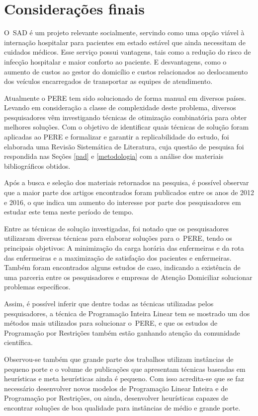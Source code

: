 \section{\esp Considerações finais }\label{conclusão}

O~\ac{SAD} é um projeto relevante socialmente, servindo como uma opção viável à internação hospitalar para pacientes em estado estável que ainda necessitam de cuidados médicos. Esse serviço possui vantagens, tais como a redução do risco de infecção hospitalar e maior conforto ao paciente. E desvantagens, como o aumento de custos ao gestor do domicílio e custos relacionados ao deslocamento dos veículos encarregados de transportar as equipes de atendimento.

Atualmente o \ac{PERE} tem sido solucionado de forma manual em diversos países. Levando em consideração a classe de complexidade deste problema, diversos pesquisadores vêm investigando técnicas de otimização combinatória para obter melhores soluções. Com o objetivo de identificar quais técnicas de solução foram aplicadas ao \ac{PERE} e formalizar e garantir a replicabilidade do estudo, foi elaborada uma Revisão Sistemática de Literatura, cuja questão de pesquisa foi respondida nas Seções \ref{pad} e \ref{metodologia} com a análise dos materiais bibliográficos obtidos.

Após a busca e seleção dos materiais retornados na pesquisa, é  possível observar que a maior parte dos artigos encontrados foram publicados entre os anos de 2012 e 2016, o que indica um aumento do interesse por parte dos pesquisadores em estudar este tema neste período de tempo. 

Entre as técnicas de solução investigadas, foi notado que os pesquisadores utilizaram diversas técnicas para elaborar soluções para o~\ac{PERE}, tendo os principais objetivos: A minimização da carga horária das enfermeiras e da rota das enfermeiras e a maximização de satisfação dos pacientes e enfermeiras. Também foram encontrados alguns estudos de caso, indicando a existência de uma parceria entre os pesquisadores e empresas de Atenção Domiciliar solucionar problemas específicos.

Assim, é possível inferir que dentre todas as técnicas utilizadas pelos pesquisadores, a técnica de Programação Inteira Linear tem se mostrado um dos métodos mais utilizados para solucionar o~\ac{PERE}, e que os estudos de Programação por Restrições também estão ganhando atenção da comunidade científica. 

Observou-se também que grande parte dos trabalhos utilizam instâncias de pequeno porte e o volume de publicações que apresentam técnicas baseadas em heurísticas e meta heurísticas ainda é pequeno. Com isso acredita-se que se faz necessário desenvolver novos modelos de Programação Linear Inteira e de Programação por Restrições, ou ainda, desenvolver heurísticas capazes de encontrar soluções de boa qualidade para instâncias de médio e grande porte.



